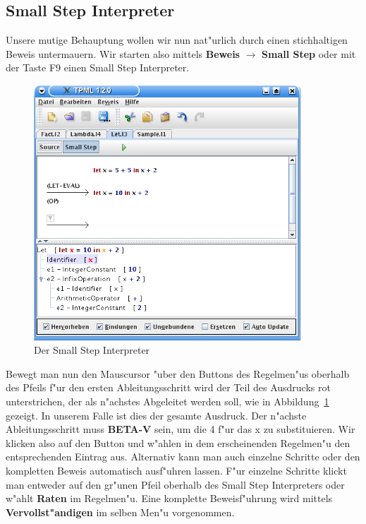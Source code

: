 \subsection{Small Step Interpreter}
Unsere mutige Behauptung wollen wir nun nat"urlich durch einen
stichhaltigen Beweis untermauern. Wir starten also mittels {\bf
Beweis} $\rightarrow$ {\bf Small Step} oder mit der Taste F9 einen
Small Step Interpreter.

\begin{figure}[h]
\begin{center}
\includegraphics[width=10cm]{images/small-step.png}
\caption{Der Small Step Interpreter}
\label{FigureSmallStep}
\end{center}
\end{figure}

Bewegt man nun den Mauscursor "uber den Buttons des Regelmen"us
oberhalb des Pfeils f"ur den ersten Ableitungsschritt wird der Teil
des Ausdrucks rot unterstrichen, der als n"achstes Abgeleitet werden
soll, wie in Abbildung~\ref{FigureSmallStep} gezeigt.
In unserem Falle ist dies der gesamte Ausdruck. Der n"achste
Ableitungsschritt muss {\bf BETA-V} sein, um die 4 f"ur das x zu
substituieren. Wir klicken also auf den Button und w"ahlen in dem
erscheinenden Regelmen"u den entsprechenden Eintrag aus. Alternativ
kann man auch einzelne Schritte oder den kompletten Beweis
automatisch ausf"uhren lassen. F"ur einzelne Schritte klickt man
entweder auf den gr"unen Pfeil oberhalb des Small Step Interpreters
oder w"ahlt {\bf Raten} im Regelmen"u. Eine komplette Beweisf"uhrung
wird mittels {\bf Vervollst"andigen} im selben Men"u vorgenommen.

